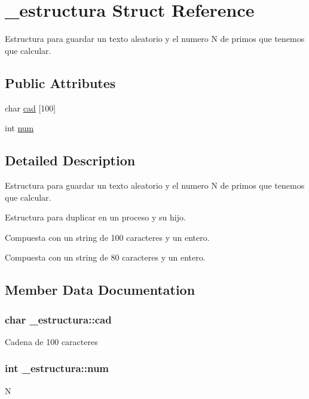 \hypertarget{struct__estructura}{}\section{\+\_\+estructura Struct Reference}
\label{struct__estructura}


Estructura para guardar un texto aleatorio y el numero N de primos que tenemos que calcular.  


\subsection*{Public Attributes}
\begin{DoxyCompactItemize}
\item 
char \hyperlink{struct__estructura_af8575f769a43e1d92db4056c93ffd50e}{cad} \mbox{[}100\mbox{]}
\item 
int \hyperlink{struct__estructura_a2642fb68e71de28dc0c6945fb1c620bb}{num}
\end{DoxyCompactItemize}


\subsection{Detailed Description}
Estructura para guardar un texto aleatorio y el numero N de primos que tenemos que calcular. 

Estructura para duplicar en un proceso y su hijo.

Compuesta con un string de 100 caracteres y un entero.

Compuesta con un string de 80 caracteres y un entero. 

\subsection{Member Data Documentation}
\subsubsection[{\texorpdfstring{cad}{cad}}]{\setlength{\rightskip}{0pt plus 5cm}char \+\_\+estructura\+::cad}\hypertarget{struct__estructura_af8575f769a43e1d92db4056c93ffd50e}{}\label{struct__estructura_af8575f769a43e1d92db4056c93ffd50e}
Cadena de 100 caracteres 
\subsubsection[{\texorpdfstring{num}{num}}]{\setlength{\rightskip}{0pt plus 5cm}int \+\_\+estructura\+::num}\hypertarget{struct__estructura_a2642fb68e71de28dc0c6945fb1c620bb}{}\label{struct__estructura_a2642fb68e71de28dc0c6945fb1c620bb}
N 

